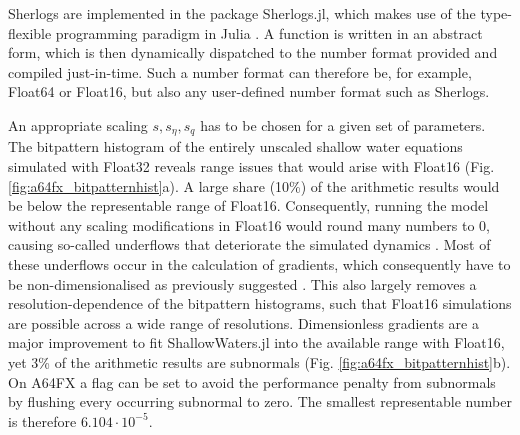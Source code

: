 Sherlogs are implemented in the package Sherlogs.jl, which makes use of the type-flexible
programming paradigm in Julia \citep{Bezanson2017}. A function is written in an abstract form,
which is then dynamically dispatched to the number format provided and compiled just-in-time.
Such a number format can therefore be, for example, Float64 or Float16, but also any user-defined
number format such as Sherlogs.

An appropriate scaling $s,s_\eta,s_q$ has to be chosen for a given set of parameters. The bitpattern
histogram of the entirely unscaled shallow water equations simulated with Float32 reveals range issues
that would arise with Float16 (Fig. \ref{fig:a64fx_bitpatternhist}a). A large share (10\%) of the arithmetic
results would be below the representable range of Float16. Consequently, running the model without
any scaling modifications in Float16 would round many numbers to 0, causing so-called underflows
that deteriorate the simulated dynamics \citep{Klower2020a}. Most of these underflows occur in the
calculation of gradients, which consequently have to be non-dimensionalised as previously suggested
\citep{Klower2019a}. This also largely removes a resolution-dependence of the bitpattern histograms,
such that Float16 simulations are possible across a wide range of resolutions. Dimensionless gradients
are a major improvement to fit ShallowWaters.jl into the available range with Float16, yet 3\% of the
arithmetic results are subnormals (Fig. \ref{fig:a64fx_bitpatternhist}b). On A64FX a flag can be set to
avoid the performance penalty from subnormals by flushing every occurring subnormal to zero.
The smallest representable number is therefore $6.104 \cdot 10^{-5}$.

